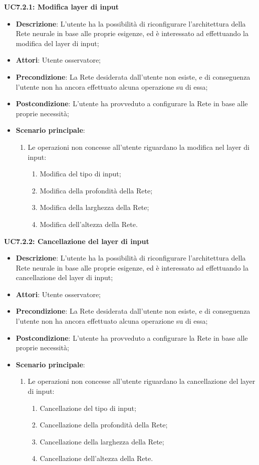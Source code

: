 \textbf{UC7.2.1: Modifica layer di input}
\label{UC7.2.1: Modifica layer di input}
\noindent
\begin{itemize}
\item \textbf{Descrizione}: L'utente ha la possibilit\`a di riconfigurare l'architettura della Rete neurale in base alle proprie esigenze, ed \`e interessato ad effettuando la modifica del layer di input;
\item \textbf{Attori}: Utente osservatore;
\item \textbf{Precondizione}: La Rete desiderata dall'utente non esiste, e di conseguenza l'utente non ha ancora effettuato alcuna operazione su di essa;
\item \textbf{Postcondizione}: L'utente ha provveduto a configurare la Rete in base alle proprie necessit\`a;
\item \textbf{Scenario principale}:
\begin{enumerate}
\item Le operazioni non concesse all'utente riguardano la modifica nel layer di input:
\begin{enumerate}
\item Modifica del tipo di input;
\item Modifica della profondit\`a della Rete;
\item Modifica della larghezza della Rete;
\item Modifica dell'altezza della Rete.
\end{enumerate}
\end{enumerate}
\end{itemize}

\textbf{UC7.2.2: Cancellazione del layer di input}
\label{UC7.2.2: Cancellazione del layer di input}
\noindent
\begin{itemize}
\item \textbf{Descrizione}: L'utente ha la possibilit\`a di riconfigurare l'architettura della Rete neurale in base alle proprie esigenze, ed \`e interessato ad effettuando la cancellazione del layer di input;
\item \textbf{Attori}: Utente osservatore;
\item \textbf{Precondizione}: La Rete desiderata dall'utente non esiste, e di conseguenza l'utente non ha ancora effettuato alcuna operazione su di essa;
\item \textbf{Postcondizione}: L'utente ha provveduto a configurare la Rete in base alle proprie necessit\`a;
\item \textbf{Scenario principale}:
\begin{enumerate}
\item Le operazioni non concesse all'utente riguardano la cancellazione del layer di input:
\begin{enumerate}
\item Cancellazione del tipo di input;
\item Cancellazione della profondit\`a della Rete;
\item Cancellazione della larghezza della Rete;
\item Cancellazione dell'altezza della Rete.
\end{enumerate}
\end{enumerate}
\end{itemize}


